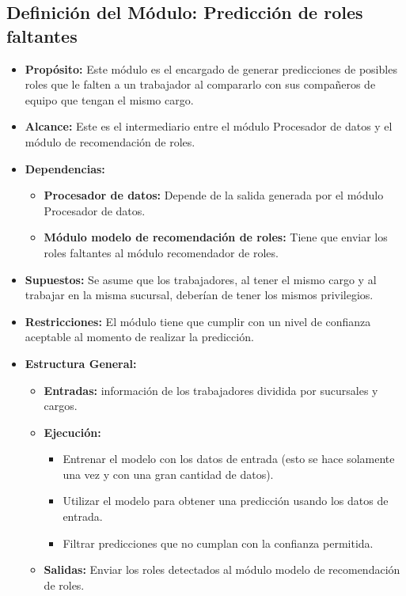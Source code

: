 \documentclass[11pt,letterpaper]{article}
\begin{document}
\subsection{Definición del Módulo: Predicción de roles faltantes}

\begin{itemize}

\item \textbf{Propósito:} Este módulo es el encargado de generar predicciones de posibles roles que le falten a un trabajador al compararlo con sus compañeros de equipo que tengan el mismo cargo.

\item \textbf{Alcance:} Este es el intermediario entre el módulo Procesador de datos y el módulo de recomendación de roles.

\item \textbf{Dependencias:}
\begin{itemize}
    \item \textbf{Procesador de datos:  }Depende de la salida generada por el módulo Procesador de datos.
    \item \textbf{Módulo modelo de recomendación de roles:  } Tiene que enviar los roles faltantes al módulo recomendador de roles.
\end{itemize}
\item \textbf{Supuestos:} Se asume que los trabajadores, al tener el mismo cargo y al trabajar en la misma sucursal, deberían de tener los mismos privilegios.

    


\item \textbf{Restricciones:} 
El módulo tiene que cumplir con un nivel de confianza aceptable al momento de realizar la predicción.
\item \textbf{Estructura General:}
\begin{itemize}
    \item \textbf{Entradas:} información de los trabajadores dividida por sucursales y cargos.
    \item \textbf{Ejecución:}
    \begin{itemize}
        \item Entrenar el modelo con los datos de entrada (esto se hace solamente una vez y con una gran cantidad de datos).
        \item Utilizar el modelo para obtener una predicción usando los datos de entrada.
        \item Filtrar predicciones que no cumplan con la confianza permitida.
    \end{itemize}
    \item \textbf{Salidas: }Enviar los roles detectados al módulo modelo de recomendación de roles.
\end{itemize}
\end{itemize}
\end{document}
